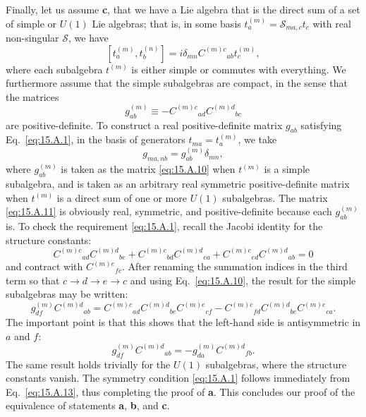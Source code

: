 Finally, let us assume \textbf{c}, that we have a Lie algebra that is the direct sum of a set of simple or $U(1)$ Lie algebras; that is, in some basis $t_a^{(m)}=\mathcal S_{ma,c}t_c$ with real non-singular $\mathcal S$, we have
\[
 [t_a^{(m)},t_b^{(n)}]
 =i\delta_{mn}C^{(m)c}{}_{ab}t_c^{(m)},
\]
where each subalgebra $t^{(m)}$ is either simple or commutes with everything. We furthermore assume that the simple subalgebras are compact, in the sense that the matrices
\begin{equation}
 g_{ab}^{(m)}\equiv-C^{(m)c}{}_{ad}C^{(m)d}{}_{bc}
 \tag{15.A.10}\label{eq:15.A.10}
\end{equation}
are positive-definite. To construct a real positive-definite matrix $g_{ab}$ satisfying Eq.~\eqref{eq:15.A.1}, in the basis of generators $t_{ma}=t_a^{(m)}$, we take
\begin{equation}
 g_{ma,nb}=g_{ab}^{(m)}\delta_{mn},
 \tag{15.A.11}\label{eq:15.A.11}
\end{equation}
where $g_{ab}^{(m)}$ is taken as the matrix \eqref{eq:15.A.10} when $t^{(m)}$ is a simple subalgebra, and is taken as an arbitrary real symmetric positive-definite matrix when $t^{(m)}$ is a direct sum of one or more $U(1)$ subalgebras. The matrix \eqref{eq:15.A.11} is obviously real, symmetric, and positive-definite because each $g_{ab}^{(m)}$ is. To check the requirement \eqref{eq:15.A.1}, recall the Jacobi identity for the structure constants:
\begin{equation}
 C^{(m)c}{}_{ad}C^{(m)d}{}_{be}
 +C^{(m)c}{}_{bd}C^{(m)d}{}_{ea}
 +C^{(m)c}{}_{ed}C^{(m)d}{}_{ab}=0
 \tag{15.A.12}\label{eq:15.A.12}
\end{equation}
and contract with $C^{(m)e}{}_{fc}$. After renaming the summation indices in the third term so that $c\longrightarrow d\longrightarrow e\longrightarrow c$ and using Eq.~\eqref{eq:15.A.10}, the result for the simple subalgebras may be written:
\[
 g_{df}^{(m)}C^{(m)d}{}_{ab}
 =C^{(m)c}{}_{ad}C^{(m)d}{}_{be}C^{(m)e}{}_{cf}
 -C^{(m)c}{}_{fd}C^{(m)d}{}_{be}C^{(m)e}{}_{ca}.
\]
The important point is that this shows that the left-hand side is antisymmetric in $a$ and $f$:
\begin{equation}
 g_{df}^{(m)}C^{(m)d}{}_{ab}
 =-g_{da}^{(m)}C^{(m)d}{}_{fb}.
 \tag{15.A.13}\label{eq:15.A.13}
\end{equation}
The same result holds trivially for the $U(1)$ subalgebras, where the structure constants vanish. The symmetry condition \eqref{eq:15.A.1} follows immediately from Eq.~\eqref{eq:15.A.13}, thus completing the proof of \textbf{a}. This concludes our proof of the equivalence of statements \textbf{a}, \textbf{b}, and \textbf{c}.

